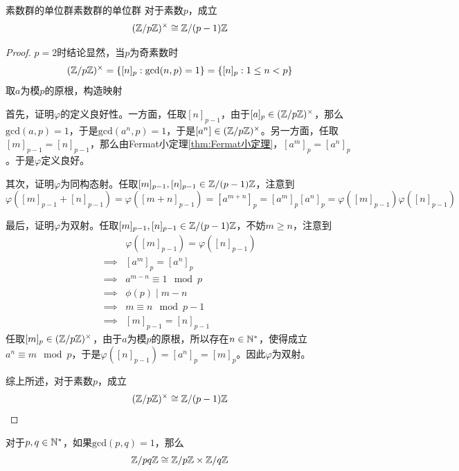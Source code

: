 \begin{theorem}{素数群的单位群}{素数群的单位群}
	对于素数$p$，成立
	\[ 
	(\mathbb{Z}/p\mathbb{Z})^{\times}\cong \mathbb{Z}/(p-1)\mathbb{Z}
	 \]
\end{theorem}

\begin{proof}
	$p=2$时结论显然，当$p$为奇素数时
	\[ 
	(\mathbb{Z}/p\mathbb{Z})^{\times}=\{ [n]_p:\mathrm{gcd}(n,p)=1 \}=\{ [n]_{p}:1\le n<p \}
	\]
	 取$a$为模$p$的原根，构造映射
	 
	 首先，证明$\varphi$的定义良好性。一方面，任取$[n]_{p-1}$，由于$[a]_p\in (\mathbb{Z}/p\mathbb{Z})^{\times}$，那么$\mathrm{gcd}(a,p)=1$，于是$\mathrm{gcd}(a^n,p)=1$，于是$[a^n]\in(\mathbb{Z}/p\mathbb{Z})^{\times}$。另一方面，任取$[m]_{p-1}=[n]_{p-1}$，那么由Fermat小定理\ref{thm:Fermat小定理}，$[a^m]_p=[a^n]_p$。于是$\varphi$定义良好。
	 
	 其次，证明$\varphi$为同构态射。任取$[m]_{p-1},[n]_{p-1}\in \mathbb{Z}/(p-1)\mathbb{Z}$，注意到
	 $$
	 \varphi([m]_{p-1}+[n]_{p-1})=\varphi([m+n]_{p-1})=[a^{m+n}]_p=[a^m]_p[a^n]_p=\varphi([m]_{p-1})\varphi([n]_{p-1})
	 $$
	 
	 最后，证明$\varphi$为双射。任取$[m]_{p-1},[n]_{p-1}\in \mathbb{Z}/(p-1)\mathbb{Z}$，不妨$m\ge n$，注意到
	 \begin{align*}
	 	& \varphi([m]_{p-1})=\varphi([n]_{p-1})\\
	 	\implies & [a^m]_{p}=[a^n]_p\\
	 	\implies & a^{m-n}\equiv 1\mod p\\
	 	\implies & \phi(p)\mid m-n\\
	 	\implies & m\equiv n\mod p-1\\
	 	\implies & [m]_{p-1}=[n]_{p-1}
	 \end{align*}
	 任取$[m]_{p}\in(\mathbb{Z}/p\mathbb{Z})^{\times}$，由于$a$为模$p$的原根，所以存在$n\in\mathbb{N}^*$，使得成立$a^n\equiv m\mod p$，于是$\varphi([n]_{p-1})=[a^n]_{p}=[m]_p$。因此$\varphi$为双射。
	 
	 综上所述，对于素数$p$，成立
	 $$
	 (\mathbb{Z}/p\mathbb{Z})^{\times}\cong \mathbb{Z}/(p-1)\mathbb{Z}
	 $$
\end{proof}

\begin{theorem}
	对于$p,q\in\mathbb{N}^*$，如果$\mathrm{gcd}(p,q)=1$，那么
	\[ 
	\mathbb{Z}/pq\mathbb{Z}\cong \mathbb{Z}/p\mathbb{Z}\times \mathbb{Z}/q\mathbb{Z}
	 \]
\end{theorem}


